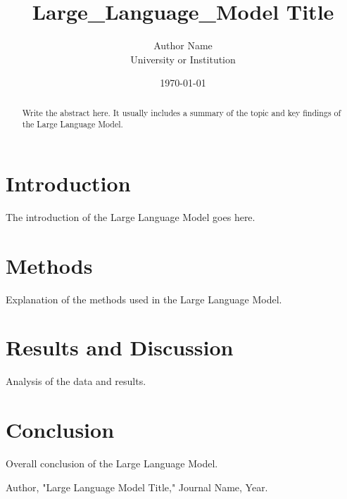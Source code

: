 \documentclass[12pt]{article}  %
\title{Large\_Language\_Model Title}  %
\author{Author Name \\ University or Institution}  %
\date{\today}  %
\begin{document}
\maketitle  %

\begin{abstract}
Write the abstract here. It usually includes a summary of the topic and key findings of the Large Language Model.
\end{abstract}

\section{Introduction}
The introduction of the Large Language Model goes here.

\section{Methods}
Explanation of the methods used in the Large Language Model.

\section{Results and Discussion}
Analysis of the data and results.

\section{Conclusion}
Overall conclusion of the Large Language Model.

\begin{thebibliography}{9}
 Author, "Large Language Model Title," Journal Name, Year.
\end{thebibliography}
\end{document}
